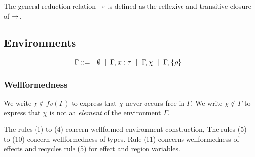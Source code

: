 \documentclass[a4paper]{article}
\begin{document}
The general reduction relation $\twoheadrightarrow $ is defined as the reflexive and
transitive closure of $\rightarrow $.

\subsection{Environments}
\label{sec:environments}
\begin{eqnarray*}
  \Gamma & ::= & \emptyset ~\mid~ \Gamma, x : \tau ~\mid~ \Gamma, \chi ~\mid~ \Gamma, \left\{ \rho \right\}\\
\end{eqnarray*}

\subsubsection*{Wellformedness}
We write $\chi\notin fv(\Gamma)$ to express that $\chi$ never occurs free in $\Gamma$. We write
$\chi\notin \Gamma$ to express that $\chi$ is not an {\em element} of the environment
$\Gamma$.


The rules (1) to (4) concern wellformed environment construction, The rules (5) to (10)
concern wellformedness of types. Rule (11) concerns wellformedness of effects
and recycles rule (5) for effect and region variables.
\end{document}
